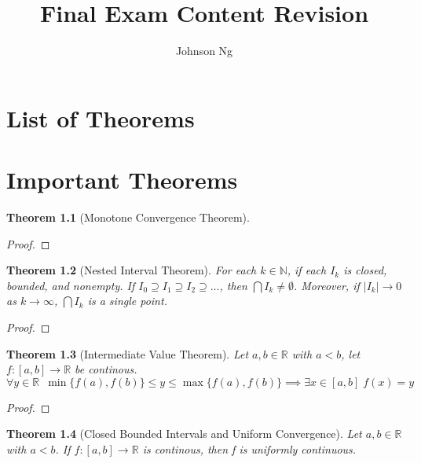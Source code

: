 \documentclass[11pt, oneside]{book}
\title{Final Exam Content Revision}
\author{Johnson Ng}
\theoremstyle{break}
\newtheorem{thm}{Theorem}[section]
\newtheorem*{proof}{Proof}
\newcommand{\bb}[1]{\mathbb{#1}}			%
\begin{document}
\maketitle

\tableofcontents

\chapter*{List of Theorems}


\chapter{Important Theorems}
\begin{thm}[Monotone Convergence Theorem]
	
\end{thm}

\begin{proof}
	
\end{proof}

\begin{thm}[Nested Interval Theorem]
	For each $k \in \bb{N}$, if each $I_k$ is closed, bounded, and nonempty. If $I_0 \supseteq I_1 \supseteq I_2 \supseteq \hdots$, then $\bigcap I_k \neq \emptyset$. Moreover, if $|I_k| \to 0$ as $k \to \infty$, $\bigcap I_k$ is a single point.
\end{thm}

\begin{proof}
	
\end{proof}

\begin{thm}[Intermediate Value Theorem]
	Let $a, b \in \bb{R}$ with $a < b$, let $f: [a, b] \to \bb{R}$ be continous.
	\begin{equation*}
		\forall y \in \bb{R} \enspace \min\{f(a), f(b)\} \leq y \leq \max\{f(a), f(b)\} \implies \exists x \in [a, b] \; f(x) = y
	\end{equation*}
\end{thm}

\begin{proof}
	
\end{proof}

\begin{thm}[Closed Bounded Intervals and Uniform Convergence]
	Let $a, b \in \bb{R}$ with $a < b$. If $f: [a, b] \to \bb{R}$ is continous, then f is uniformly continuous.
\end{thm}
\end{document}

